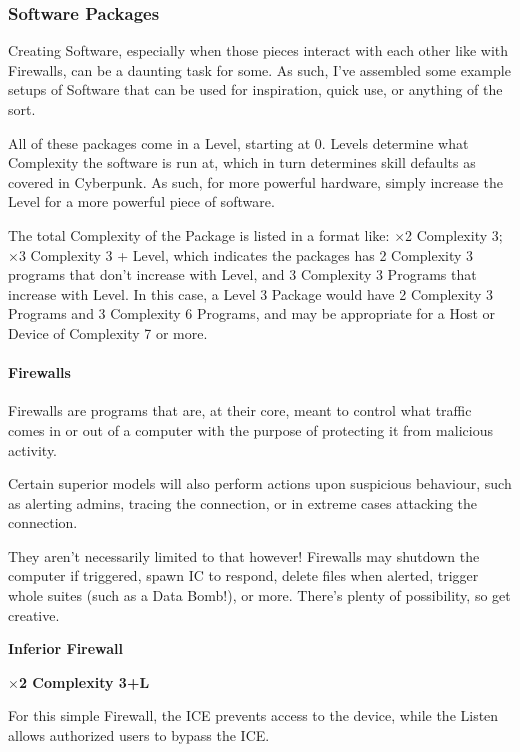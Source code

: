	\begin{multicols}{2}
	
	\subsubsection{Software Packages}\label{software_packages}
	
	Creating Software, especially when those pieces interact with each other like with Firewalls, can be a daunting task for some. As such, I've assembled some example setups of Software that can be used for inspiration, quick use, or anything of the sort.
	
	All of these packages come in a Level, starting at 0. Levels determine what Complexity the software is run at, which in turn determines skill defaults as covered in Cyberpunk. As such, for more powerful hardware, simply increase the Level for a more powerful piece of software.
	
	The total Complexity of the Package is listed in a format like: $\times$2 Complexity 3; $\times$3 Complexity 3 + Level, which indicates the packages has 2 Complexity 3 programs that don't increase with Level, and 3 Complexity 3 Programs that increase with Level. In this case, a Level 3 Package would have 2 Complexity 3 Programs and 3 Complexity 6 Programs, and may be appropriate for a Host or Device of Complexity 7 or more.
	
	\paragraph{Firewalls}\label{firewall}
	
	Firewalls are programs that are, at their core, meant to control what traffic comes in or out of a computer with the purpose of protecting it from malicious activity. 
	
	Certain superior models will also perform actions upon suspicious behaviour, such as alerting admins, tracing the connection, or in extreme cases attacking the connection.
	
	They aren't necessarily limited to that however! Firewalls may shutdown the computer if triggered, spawn IC to respond, delete files when alerted, trigger whole suites (such as a Data Bomb!), or more. There's plenty of possibility, so get creative.
	
	\textbf{Inferior Firewall} 
	
	\textbf{$\times$2 Complexity 3+L}
	
	For this simple Firewall, the ICE prevents access to the device, while the Listen allows authorized users to bypass the ICE.
	

\end{multicols}
